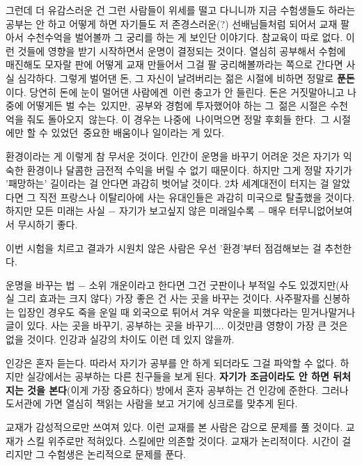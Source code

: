 그런데 더 유감스러운 건 그런 사람들이 위세를 떨고 다니니까 지금 수험생들도 하라는 공부는 안 하고
어떻게 하면 자기들도 저 존경스러운(?) 선배님들처럼 되어서 교재 팔아서 수천수억을 벌어볼까 그 궁리를 하는 게 보인단 이야기다.
참교육이 따로 없다. 이런 것들에 영향을 받기 시작하면서 운명이 결정되는 것이다.
열심히 공부해서 수험에 매진해도 모자랄 판에 어떻게 교재 만들어서 그걸 팔 궁리해볼까라는 쪽으로 간다면 사실 심각하다.
그렇게 벌어댄 돈, 그 자신이 날려버리는 젊은 시절에 비하면 정말로 \textbf{푼돈}이다. 당연히 돈에 눈이 멀어댄 사람에겐 이런 충고가 안 들린다.
돈은 거짓말아니고 나중에 어떻게든 벌 수는 있지만, 공부와 경험에 투자했어야 하는 그 젊은 시절은 수천억을 줘도 돌아오지 않는다.
이 경우는 나중에 나이먹으면 정말 후회들 한다. 그 시절에만 할 수 있었던 중요한 배움이나 일이라는 게 있다.
\vspace{5mm}

환경이라는 게 이렇게 참 무서운 것이다.
인간이 운명을 바꾸기 어려운 것은 자기가 익숙한 환경이나 달콤한 금전적 수익을 버릴 수 없기 때문이다.
하지만 그게 정말 자기가 '패망하는' 길이라는 걸 안다면 과감히 벗어날 것이다.
2차 세계대전이 터지는 걸 알았다면 그 직전 프랑스나 이탈리아에 사는 유대인들은 과감히 미국으로 탈출했을 것이다.
하지만 모든 미래는 사실 $-$ 자기가 보고싶지 않은 미래일수록 $-$ 매우 터무니없어보여서 무시하기 좋다.
\vspace{5mm}

이번 시험을 치르고 결과가 시원치 않은 사람은 우선 '환경'부터 점검해보는 걸 추천한다.
\vspace{5mm}

운명을 바꾸는 법 $-$ 소위 개운이라고 한다면 그건 굿판이나 부적일 수도 있겠지만(사실 그리 효과는 크지 않다)
가장 좋은 건 사는 곳을 바꾸는 것이다.
사주팔자를 신봉하는 입장인 경우도 죽을 운일 때 외국으로 튀어서 겨우 악운을 피했다라는 믿거나말거나 글이 있다.
사는 곳을 바꾸기, 공부하는 곳을 바꾸기.... 이것만큼 영향이 가장 큰 것은 없을 것이다.
인강과 실강의 차이도 이런 데 있지 않을까.
\vspace{5mm}

인강은 혼자 듣는다. 따라서 자기가 공부를 안 하게 되더라도 그걸 파악할 수 없다.
하지만 실강에서는 공부하는 다른 친구들을 보게 된다. \textbf{자기가 조금이라도 안 하면 뒤처지는 것을 본다}(이게 가장 중요하다)
방에서 혼자 공부하는 건 인강에 준한다. 그러나 도서관에 가면 열심히 책읽는 사람을 보고 거기에 싱크로를 맞추게 된다.
\vspace{5mm}

교재가 감성적으로만 쓰여져 있다. 이런 교재를 본 사람은 감으로 문제를 풀 것이다.
교재가 스킬 위주로만 적혀있다. 스킬에만 의존할 것이다.
교재가 논리적이다. 시간이 걸리지만 그 수험생은 논리적으로 문제를 푼다.
\vspace{5mm}

